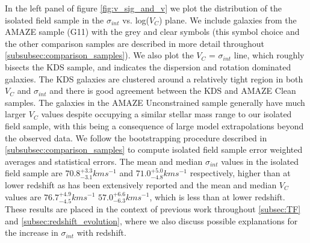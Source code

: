 \documentclass[fleqn,usenatbib]{mn2e}
\begin{document}
In the left panel of figure \ref{fig:v_sig_and_v} we plot the distribution of the isolated field sample in the $\sigma_{int}$ vs. log($V_{C}$) plane.
We include galaxies from the AMAZE sample (G11) with the grey and clear symbols (this symbol choice and the other comparison samples are described in more detail throughout \cref{subsubsec:comparison_samples}). 
We also plot the $V_{C}$ = $\sigma_{int}$ line, which roughly bisects the KDS sample, and indicates the dispersion and rotation dominated galaxies.
The KDS galaxies are clustered around a relatively tight region in both $V_{C}$ and $\sigma_{int}$ and there is good agreement between the KDS and AMAZE Clean samples.
The galaxies in the AMAZE Unconstrained sample generally have much larger $V_{C}$ values despite occupying a similar stellar mass range to our isolated field sample, with this being a consequence of large model extrapolations beyond the observed data.
We follow the bootstrapping procedure described in \cref{subsubsec:comparison_samples} to compute isolated field sample error weighted averages and statistical errors.
The mean and median $\sigma_{int}$ values in the isolated field sample are $70.8^{+3.3}_{-3.1} kms^{-1}$ and $71.0^{+5.0}_{-4.8} kms^{-1}$ respectively, higher than at lower redshift as has been extensively reported \citep[e.g.][]{Genzel2006,Genzel2008,ForsterSchreiber2009,Law2009,Gnerucci2011,Epinat2012,Wisnioski2015} and the mean and median $V_{C}$ values are $76.7^{+4.9}_{-4.5}kms^{-1}$ $57.0^{+6.6}_{-6.3}kms^{-1}$, which is less than at lower redshift.
These results are placed in the context of previous work throughout \cref{subsec:TF} and \cref{subsec:redshift_evolution}, where we also discuss possible explanations for the increase in $\sigma_{int}$ with redshift.\\
\end{document}
